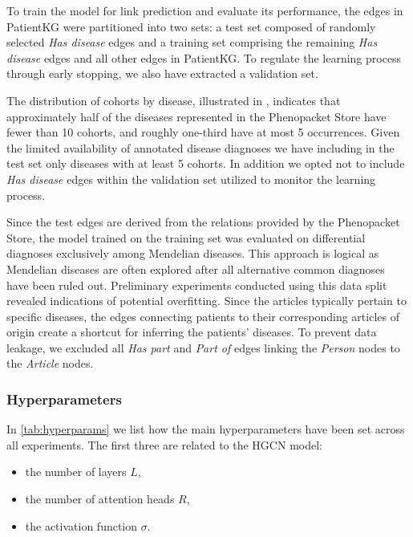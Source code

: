 To train the model for link prediction and evaluate its performance, the edges in PatientKG were partitioned into two sets: a test set composed of randomly selected \emph{Has disease} edges and a training set comprising the remaining \emph{Has disease} edges and all other edges in PatientKG. To regulate the learning process through early stopping, we also have extracted a validation set.

The distribution of cohorts by disease, illustrated in , indicates that approximately half of the diseases represented in the Phenopacket Store have fewer than 10 cohorts, and roughly one-third have at most 5 occurrences. Given the limited availability of annotated disease diagnoses we have including in the test set only diseases with at least 5 cohorts. In addition we opted not to include \emph{Has disease} edges within the validation set utilized to monitor the learning process.

Since the test edges are derived from the relations provided by the Phenopacket Store, the model trained on the training set was evaluated on differential diagnoses exclusively among Mendelian diseases. This approach is logical as Mendelian diseases are often explored after all alternative common diagnoses have been ruled out. Preliminary experiments conducted using this data split revealed indications of potential overfitting. Since the articles typically pertain to specific diseases, the edges connecting patients to their corresponding articles of origin create a shortcut for inferring the patients' diseases. To prevent data leakage, we excluded all \emph{Has part} and \emph{Part of} edges linking the \emph{Person} nodes to the \emph{Article} nodes.

\medskip

\subsubsection{Hyperparameters}

In \cref{tab:hyperparams} we list how the main hyperparameters have been set across all experiments. The first three are related to the HGCN model:
\begin{itemize}
  \item the number of layers $L$,
  \item the number of attention heads $R$,
  \item the activation function $\sigma$.
\end{itemize}

